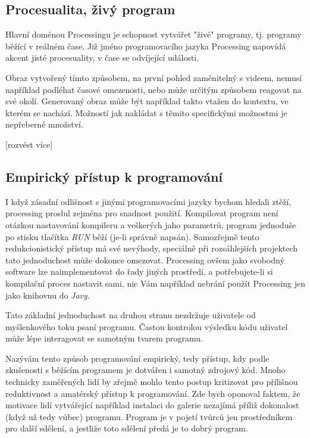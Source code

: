 \documentclass[11pt]{article}
\begin{document}
\subsection{Procesualita, živý program}

Hlavní doménou Processingu je schopnost vytvářet "živé" programy, tj. programy běžící v reálném čase. Již jméno programovacího jazyka Processing napovídá akcent jisté procesuality, v čase se odvíjející události.

Obraz vytvořený tímto způsobem, na první pohled zaměnitelný s videem, nemusí například podléhat časové omezenosti, nebo může určitým způsobem reagovat na své okolí. Generovaný obraz může být například takto vtažen do kontextu, ve kterém se nachází. Možností jak nakládat s těmito specifickými možnostmi je nepřeberné množství.

[rozvést více]

\subsection{Empirický přístup k programování}

	I když zásadní odlišnost s jinými programovacími jazyky bychom hledali ztěží, processing proslul zejména pro snadnost použití. Kompilovat program není otázkou nastavování kompileru a veškerých jaho parametrů, program jednoduše po stisku tlačítka {\em RUN} běží (je-li správně napsán). Samozřejmě tento redukcionistický přístup má své nevýhody, speciálně při rozsáhlejších projektech tato jednoduchost může dokonce omezovat. Processing ovšem jako svobodný software lze naimplementovat do řady jiných prostředí, a potřebujete-li si kompilační proces nastavit sami, nic Vám například nebrání použít Processing jen jako knihovnu do {\em Javy}.

Tato základní jednoduchost na druhou stranu nezdržuje uživatele od myšlenkového toku psaní programu. Častou kontrolou výsledku kódu uživatel může lépe interagovat se samotným tvarem programu.

Nazývám tento způsob programování empirický, tedy přístup, kdy podle zkušenosti s běžícím programem je dotvářen i samotný zdrojový kód. Mnoho technicky zaměřených lidí by zřejmě mohlo tento postup kritizovat pro přílišnou reduktivnost a amatérský přístup k programování. Zde bych oponoval faktem, že motivace lidí vytvářející například instalaci do galerie nezajímá příliž dokonalost (když už tedy vůbec) programu. Program je v pojetí tvůrců jen prostředníkem pro další sdělení, a jestliže toto sdělení předá je to dobrý program.
\end{document}

